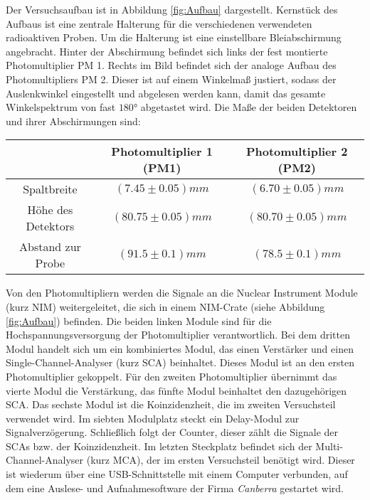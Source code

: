 \documentclass{../Misc/MontavonLaTeX/Montavon}
\begin{document}
Der Versuchsaufbau ist in Abbildung \ref{fig:Aufbau} dargestellt. Kernstück des Aufbaus ist eine zentrale Halterung für die verschiedenen verwendeten radioaktiven Proben. Um die Halterung ist eine einstellbare Bleiabschirmung angebracht. Hinter der Abschirmung befindet sich links der fest montierte Photomultiplier PM 1. Rechts im Bild befindet sich der analoge Aufbau des Photomultipliers PM 2. Dieser ist auf einem Winkelmaß justiert, sodass der Auslenkwinkel eingestellt und abgelesen werden kann, damit das gesamte Winkelspektrum von fast $180 \unit{\degree}$ abgetastet wird. Die Maße der beiden Detektoren und ihrer Abschirmungen sind:

\begin{table}[htbp]
\centering
\begin{tabular}{|c|c|c|}
\hline
 & Photomultiplier 1 (PM1)  & Photomultiplier 2 (PM2) \\
\hline \hline
Spaltbreite & $(7.45\pm0.05) \unit{mm}$ & $(6.70\pm0.05) \unit{mm}$ \\
Höhe des Detektors & $(80.75\pm0.05) \unit{mm}$ & $(80.70\pm0.05) \unit{mm}$ \\
Abstand zur Probe & $(91.5\pm0.1) \unit{mm}$ & $(78.5\pm0.1) \unit{mm}$ \\ 
\hline
\end{tabular}
\label{tbl:Detektorwerte}
\end{table}

Von den Photomultipliern werden die Signale an die Nuclear Instrument Module (kurz NIM) weitergeleitet, die sich in einem NIM-Crate (siehe Abbildung \ref{fig:Aufbau}) befinden. Die beiden linken Module sind für die Hochspannungsversorgung der Photomultiplier verantwortlich. Bei dem dritten Modul handelt sich um ein kombiniertes Modul, das einen Verstärker und einen Single-Channel-Analyser (kurz SCA) beinhaltet. Dieses Modul ist an den ersten Photomultiplier gekoppelt. Für den zweiten Photomultiplier übernimmt das vierte Modul die Verstärkung, das fünfte Modul beinhaltet den dazugehörigen SCA. Das sechste Modul ist die Koinzidenzheit, die im zweiten Versuchsteil verwendet wird. Im siebten Modulplatz steckt ein Delay-Modul zur Signalverzögerung. Schließlich folgt der Counter, dieser zählt die Signale der SCAs bzw. der Koinzidenzheit. Im letzten Steckplatz befindet sich der Multi-Channel-Analyser (kurz MCA), der im ersten Versuchsteil benötigt wird. Dieser ist wiederum über eine USB-Schnittstelle mit einem Computer verbunden, auf dem eine Auslese- und Aufnahmesoftware der Firma \emph{Canberra} gestartet wird. 
\end{document}
